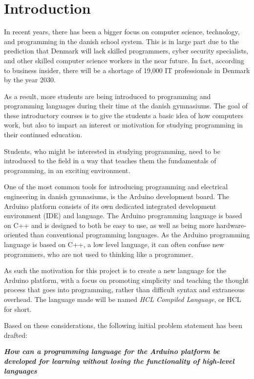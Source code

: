 \chapter{Introduction}
In recent years, there has been a bigger focus on computer science, technology, and programming in the danish school system.
This is in large part due to the prediction that Denmark will lack skilled programmers, cyber security specialists, and other skilled computer science workers in the near future.
In fact, according to business insider, there will be a shortage of 19,000 IT professionals in Denmark by the year 2030\cite{ITLackDK}.

As a result, more students are being introduced to programming and programming languages during their time at the
danish gymnasiums. 
The goal of these introductory courses is to give the students a basic idea of how computers work, but also to impart an interest or motivation for studying programming in their continued education.

Students, who might be interested in studying programming, need to be introduced to the field in a way that teaches them the fundamentals of programming, in an exciting environment.

One of the most common tools for introducing programming and electrical engineering in danish gymnasiums, is the Arduino development board. 
The Arduino platform consists of its own dedicated integrated development environment (IDE) and language.
The Arduino programming language is based on C++ and is designed to both be easy to use, as well as being more hardware-oriented than conventional programming languages\cite{ArFAQ}.
As the Arduino programming language is based on C++, a low level language, it can often confuse new programmers, who are not used to thinking like a programmer.

As such the motivation for this project is to create a new language for the Arduino platform, with a focus on promoting simplicity and teaching the thought process that goes into programming, rather than difficult syntax and extraneous overhead.
The language made will be named \textit{HCL Compiled Language}, or HCL for short.

Based on these considerations, the following initial problem statement has been drafted:

\begin{center}
	\textit{\textbf{How can a programming language for the Arduino platform be developed for learning without losing the functionality of high-level languages}}
\end{center}
